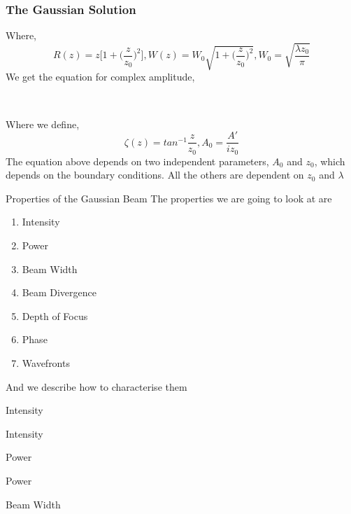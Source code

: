 \documentclass[11pt]{beamer}
\begin{document}
		\begin{frame}
		\frametitle{The Gaussian Solution}
	Where,
	\[R(z)=z\bigg[1+\big(\frac{z}{z_0}\big)^2\bigg],W(z)=W_0\sqrt{1+\big(\frac{z}{z_0}\big)^2},W_0=\sqrt{\frac{\lambda z_0}{\pi}}\]
	We get the equation for complex amplitude,
	\begin{center}
	\\
	\end{center}
	Where we define,
	\[\zeta(z)=tan^{-1}\frac{z}{z_0}, A_0=\frac{A'}{iz_0}\]
	The equation above depends on two independent parameters, $A_0$ and $z_0$, which depends on the boundary conditions. All the others are dependent on $z_0$ and $\lambda$
	
	\end{frame}

	
	
	\begin{frame}{Properties of the Gaussian Beam}
	The properties we are going to look at are
	\begin{enumerate}
		\item Intensity
		\item Power
		\item Beam Width
		\item Beam Divergence
		\item Depth of Focus
		\item Phase
		\item Wavefronts
	\end{enumerate}
	And we describe how to characterise them
	\end{frame}
	
	\begin{frame}{Intensity}
		
	\end{frame}
	
	\begin{frame}{Intensity}
		
	\end{frame}
	
	\begin{frame}{Power}
		
	\end{frame}
	
	\begin{frame}{Power}
		
	\end{frame}
	
	\begin{frame}{Beam Width}
		
	\end{frame}
	
\end{document}
